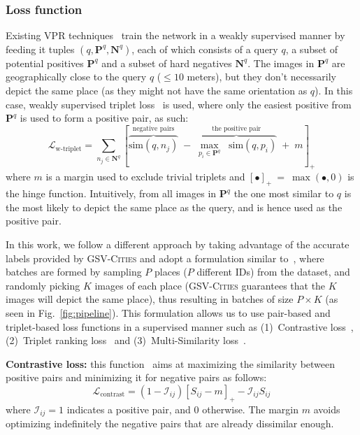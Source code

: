 \documentclass{article}
\begin{document}
\subsubsection{Loss function}\label{sec:loss}

Existing VPR techniques~\cite{arandjelovic2016netvlad, kim2017learned, liu2019stochastic, warburg2020mapillary} train the network in a weakly supervised manner by feeding it tuples $\left(q, \mathbf{P}^q, \mathbf{N}^q \right)$, each of which consists of a query $q$, a subset of potential positives $\mathbf{P}^q$ and a subset of hard negatives $\mathbf{N}^q$. The images in $\mathbf{P}^q$ are geographically close to the query $q$ ($\leq 10$ meters), but they don't necessarily depict the same place (as they might not have the same orientation as $q$). In this case, weakly supervised triplet loss~\cite{arandjelovic2016netvlad} is used, where only the easiest positive from $\mathbf{P}^q$ is used to form a positive pair, as such: 
\begin{equation}
    \mathcal{L}_{\text{w-triplet}} = \sum_{n_j \in \mathbf{N}^q} \left[ \overbrace{\text{sim} \left(q, n_{j}\right) }^{\text{negative pairs}}
     \; - \; \overbrace{\underset{p_i \in \mathbf{P}^q}{\max}  \; \; \text{sim} \left(q, p_{i} \right)}^{\text{the positive pair}} \; + \; m  \right]_+
\label{loss:w_triplet}
\end{equation}
where $m$ is a margin used to exclude trivial triplets and $[\bullet]_+~=~\max(\bullet, 0)$ is the hinge function. Intuitively, from all images in $\mathbf{P}^q$ the one most similar to $q$ is the most likely to depict the same place as the query, and is hence used as the positive pair.

In this work, we follow a different approach by taking advantage of the accurate labels provided by \textsc{GSV-Cities} and adopt a formulation similar to~\cite{hermans2017defense}, where batches are formed by sampling $P$ places ($P$ different IDs) from the dataset, and randomly picking $K$ images of each place (\textsc{GSV-Cities} guarantees that the $K$ images will depict the same place), thus resulting in batches of size $P {\times} K$ (as seen in Fig.~\ref{fig:pipeline}). This formulation allows us to use pair-based and triplet-based loss functions in a supervised manner such as (1)~Contrastive loss~\cite{hadsell2006dimensionality}, (2)~Triplet ranking loss~\cite{hoffer2015deep} and (3)~Multi-Similarity loss~\cite{wang2019multi}.

\vspace{2pt}
\noindent\textbf{Contrastive loss:} this function~\cite{hadsell2006dimensionality} aims at maximizing the similarity between positive pairs and minimizing it for negative pairs as follows:
\begin{equation}
    \mathcal{L}_{\text{contrast}} = \left(1-\mathcal{I}_{i j} \right) \left[S_{ij} - m \right]_{+} - \mathcal{I}_{i j} S_{i j}
\label{loss:contrastive}
\end{equation}
where $\mathcal{I}_{i j} = 1$ indicates a positive pair, and $0$ otherwise. The margin $m$ avoids optimizing indefinitely the negative pairs that are already dissimilar enough.
\end{document}
